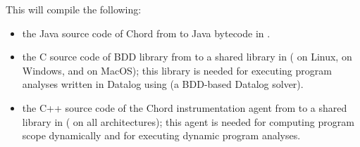 \noindent This will compile the following:
\begin{itemize}
\item
the Java source code of Chord from  to Java bytecode
in .
\item
the C source code of BDD library
 from
 to a shared library in 
( on Linux,  on Windows, and
 on MacOS); this library is needed for executing
program analyses written in Datalog using
 (a
BDD-based Datalog solver).
\item
the C++ source code of the Chord instrumentation agent from
 to a shared library in 
( on all architectures); this agent is
needed for computing program scope dynamically and for executing
dynamic program analyses.
\end{itemize}

